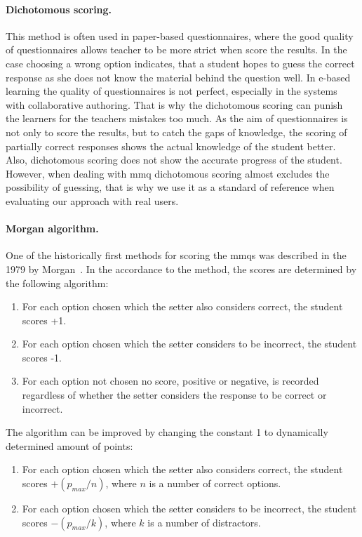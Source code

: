 \documentclass[PhD, Submit, ngerman,UKenglish,table]{scrbook}
\begin{document}
\paragraph{Dichotomous scoring.}

This method is often used in paper-based questionnaires, where the good quality of questionnaires allows teacher to be more strict when score the results.
In the case choosing a wrong option indicates, that a student hopes to guess the correct response as she does not know the material behind the question well.
In e-based learning the quality of questionnaires is not perfect, especially in the systems with collaborative authoring.
That is why the dichotomous scoring can punish the learners for the teachers mistakes too much. 
As the aim of questionnaires is not only to score the results, but to catch the gaps of knowledge, the scoring of partially correct responses shows the actual knowledge of the student better.
Also, dichotomous scoring does not show the accurate progress of the student.
However, when dealing with \gls{mmq} dichotomous scoring almost excludes the possibility of guessing, that is why we use it as a standard of reference when evaluating our approach with real users.

\paragraph{Morgan algorithm.}
One of the historically first methods for scoring the \gls{mmq}s was described in the 1979 by Morgan~\cite{Morgan1979}.
In the accordance to the method, the scores are determined by the following algorithm:

\begin{enumerate}
    \item For each option chosen which the setter also considers correct, the student scores +1.
    \item For each option chosen which the setter considers to be incorrect, the student scores -1.
    \item For each option not chosen no score, positive or negative, is recorded regardless of whether the setter considers the response to be correct or incorrect.
\end{enumerate}

The algorithm can be improved by changing the constant 1 to dynamically determined amount of points:

\begin{enumerate}
    \item For each option chosen which the setter also considers correct, the student scores $+(p_{max}/n)$, where $n$ is a number of correct options.
    \item For each option chosen which the setter considers to be incorrect, the student scores $-(p_{max}/k)$, where $k$ is a number of distractors.
\end{enumerate}
\end{document}

